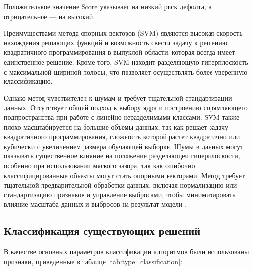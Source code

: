 Положительное значение $\text{Score}$ указывает на низкий риск дефолта, а отрицательное --- на высокий.

Преимуществами метода опорных векторов (SVM) являются высокая скорость нахождения решающих функций и возможность свести задачу к решению квадратичного программирования в выпуклой области, которая всегда имеет единственное решение. Кроме того, SVM находит разделяющую гиперплоскость с максимальной шириной полосы, что позволяет осуществлять более уверенную классификацию.

Однако метод чувствителен к шумам и требует тщательной стандартизации данных. Отсутствует общий подход к выбору ядра и построению спрямляющего подпространства при работе с линейно неразделимыми классами. SVM также плохо масштабируется на большие объемы данных, так как решает задачу квадратичного программирования, сложность которой растет квадратично или кубически с увеличением размера обучающей выборки. Шумы в данных могут оказывать существенное влияние на положение разделяющей гиперплоскости, особенно при использовании мягкого зазора, так как ошибочно классифицированные объекты могут стать опорными векторами. Метод требует тщательной предварительной обработки данных, включая нормализацию или стандартизацию признаков и управление выбросами, чтобы минимизировать влияние масштаба данных и выбросов на результат модели \cite{Xiangdong}.


\subsection{Классификация существующих решений}

В качестве основных параметров классификации алгоритмов были использованы признаки, приведенные в таблице \ref{tab:type_classification}:

